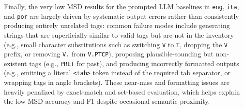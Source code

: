 Finally, the very low \ac{MSD} results for the prompted LLM baselines in \texttt{eng}, \texttt{ita}, and \texttt{por} are largely driven by systematic output errors rather than consistently producing entirely unrelated tags: common failure modes include generating strings that are superficially similar to valid tags but are not in the inventory (e.g., small character substitutions such as switching \texttt{V} to \texttt{T}, dropping the \texttt{V} prefix, or removing \texttt{V.} from \texttt{V.PTCP}), proposing plausible-sounding but non-existent tags (e.g., \texttt{PRET} for past), and producing incorrectly formatted outputs (e.g., emitting a literal \texttt{<tab>} token instead of the required tab separator, or wrapping tags in angle brackets). These near-miss and formatting issues are heavily penalized by exact-match and set-based evaluation, which helps explain the low \ac{MSD} accuracy and F1 despite occasional semantic proximity.
